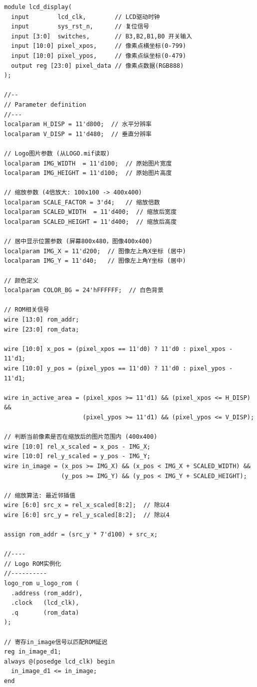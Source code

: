 \documentclass[12pt,hyperref,a4paper,UTF8]{ctexart}
\begin{document}
\begin{lstlisting}[caption={lcd\_display.v完整代码}]
module lcd_display(
  input        lcd_clk,        // LCD驱动时钟
  input        sys_rst_n,      // 复位信号
  input [3:0]  switches,       // B3,B2,B1,B0 开关输入
  input [10:0] pixel_xpos,     // 像素点横坐标(0-799)
  input [10:0] pixel_ypos,     // 像素点纵坐标(0-479)
  output reg [23:0] pixel_data // 像素点数据(RGB888)
);

//--
// Parameter definition
//---
localparam H_DISP = 11'd800;  // 水平分辨率
localparam V_DISP = 11'd480;  // 垂直分辨率

// Logo图片参数 (从LOGO.mif读取)
localparam IMG_WIDTH  = 11'd100;  // 原始图片宽度
localparam IMG_HEIGHT = 11'd100;  // 原始图片高度

// 缩放参数 (4倍放大: 100x100 -> 400x400)
localparam SCALE_FACTOR = 3'd4;   // 缩放倍数
localparam SCALED_WIDTH  = 11'd400;  // 缩放后宽度
localparam SCALED_HEIGHT = 11'd400;  // 缩放后高度

// 居中显示位置参数 (屏幕800x480，图像400x400)
localparam IMG_X = 11'd200;  // 图像左上角X坐标 (居中)
localparam IMG_Y = 11'd40;   // 图像左上角Y坐标 (居中)

// 颜色定义
localparam COLOR_BG = 24'hFFFFFF;  // 白色背景

// ROM相关信号
wire [13:0] rom_addr;
wire [23:0] rom_data;

wire [10:0] x_pos = (pixel_xpos == 11'd0) ? 11'd0 : pixel_xpos - 11'd1;
wire [10:0] y_pos = (pixel_ypos == 11'd0) ? 11'd0 : pixel_ypos - 11'd1;

wire in_active_area = (pixel_xpos >= 11'd1) && (pixel_xpos <= H_DISP) &&
                      (pixel_ypos >= 11'd1) && (pixel_ypos <= V_DISP);

// 判断当前像素是否在缩放后的图片范围内 (400x400)
wire [10:0] rel_x_scaled = x_pos - IMG_X;
wire [10:0] rel_y_scaled = y_pos - IMG_Y;
wire in_image = (x_pos >= IMG_X) && (x_pos < IMG_X + SCALED_WIDTH) && 
                (y_pos >= IMG_Y) && (y_pos < IMG_Y + SCALED_HEIGHT);

// 缩放算法: 最近邻插值
wire [6:0] src_x = rel_x_scaled[8:2];  // 除以4
wire [6:0] src_y = rel_y_scaled[8:2];  // 除以4

assign rom_addr = (src_y * 7'd100) + src_x;

//----
// Logo ROM实例化
//----------
logo_rom u_logo_rom (
  .address (rom_addr),
  .clock   (lcd_clk),
  .q       (rom_data)
);

// 寄存in_image信号以匹配ROM延迟
reg in_image_d1;
always @(posedge lcd_clk) begin
  in_image_d1 <= in_image;
end


\end{lstlisting}
\end{document}
